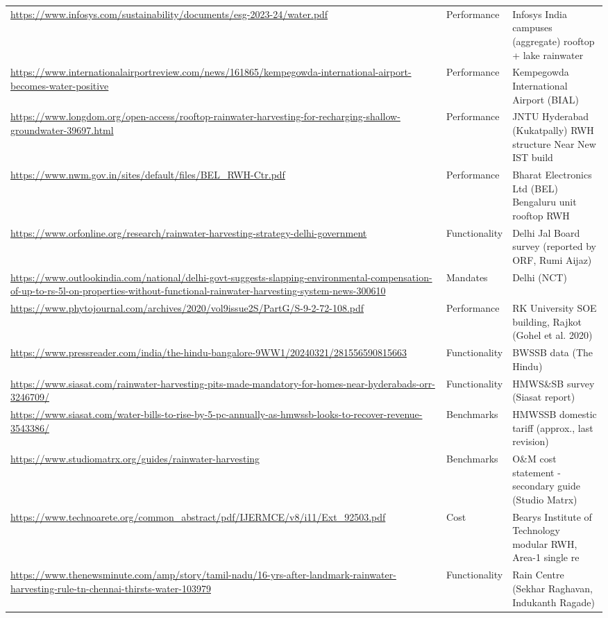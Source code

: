 {\begin{longtable}{p{9.2cm} p{2.5cm} p{4.2cm}}
\url{https://www.infosys.com/sustainability/documents/esg-2023-24/water.pdf} & Performance & Infosys India campuses (aggregate) rooftop + lake rainwater\\
\url{https://www.internationalairportreview.com/news/161865/kempegowda-international-airport-becomes-water-positive} & Performance & Kempegowda International Airport (BIAL)\\
\url{https://www.longdom.org/open-access/rooftop-rainwater-harvesting-for-recharging-shallow-groundwater-39697.html} & Performance & JNTU Hyderabad (Kukatpally) RWH structure Near New IST build\\
\url{https://www.nwm.gov.in/sites/default/files/BEL_RWH-Ctr.pdf} & Performance & Bharat Electronics Ltd (BEL) Bengaluru unit rooftop RWH\\
\url{https://www.orfonline.org/research/rainwater-harvesting-strategy-delhi-government} & Functionality & Delhi Jal Board survey (reported by ORF, Rumi Aijaz)\\
\url{https://www.outlookindia.com/national/delhi-govt-suggests-slapping-environmental-compensation-of-up-to-rs-5l-on-properties-without-functional-rainwater-harvesting-system-news-300610} & Mandates & Delhi (NCT)\\
\url{https://www.phytojournal.com/archives/2020/vol9issue2S/PartG/S-9-2-72-108.pdf} & Performance & RK University SOE building, Rajkot (Gohel et al. 2020)\\
\url{https://www.pressreader.com/india/the-hindu-bangalore-9WW1/20240321/281556590815663} & Functionality & BWSSB data (The Hindu)\\
\url{https://www.siasat.com/rainwater-harvesting-pits-made-mandatory-for-homes-near-hyderabads-orr-3246709/} & Functionality & HMWS\&SB survey (Siasat report)\\
\url{https://www.siasat.com/water-bills-to-rise-by-5-pc-annually-as-hmwssb-looks-to-recover-revenue-3543386/} & Benchmarks & HMWSSB domestic tariff (approx., last revision)\\
\url{https://www.studiomatrx.org/guides/rainwater-harvesting} & Benchmarks & O\&M cost statement - secondary guide (Studio Matrx)\\
\url{https://www.technoarete.org/common_abstract/pdf/IJERMCE/v8/i11/Ext_92503.pdf} & Cost & Bearys Institute of Technology modular RWH, Area-1 single re\\
\url{https://www.thenewsminute.com/amp/story/tamil-nadu/16-yrs-after-landmark-rainwater-harvesting-rule-tn-chennai-thirsts-water-103979} & Functionality & Rain Centre (Sekhar Raghavan, Indukanth Ragade)\\

\end{longtable}}
